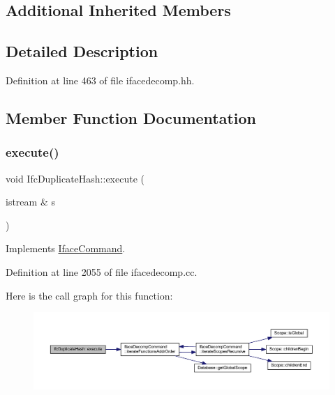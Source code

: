 \subsection*{Additional Inherited Members}


\subsection{Detailed Description}


Definition at line 463 of file ifacedecomp.\+hh.



\subsection{Member Function Documentation}
\mbox{\label{class_ifc_duplicate_hash_a8a4048b58da97771dcad39343e231b03}} 
\subsubsection{\texorpdfstring{execute()}{execute()}}
{\footnotesize\ttfamily void Ifc\+Duplicate\+Hash\+::execute (\begin{DoxyParamCaption}\item[{istream \&}]{s }\end{DoxyParamCaption})\hspace{0.3cm}{\ttfamily [virtual]}}



Implements \mbox{\hyperlink{class_iface_command_af10e29cee2c8e419de6efe9e680ad201}{Iface\+Command}}.



Definition at line 2055 of file ifacedecomp.\+cc.

Here is the call graph for this function\+:
\nopagebreak
\begin{figure}[H]
\begin{center}
\leavevmode
\includegraphics[width=350pt]{class_ifc_duplicate_hash_a8a4048b58da97771dcad39343e231b03_cgraph}
\end{center}
\end{figure}
\mbox{\label{class_ifc_duplicate_hash_a5459747ed3d0b946f717556fd9e40c08}} 
